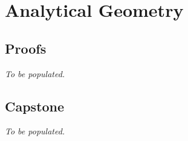 \chapter{Analytical Geometry}

\clearpage

\clearpage

\section*{Proofs}
\textit{To be populated.}

\section*{Capstone}
\textit{To be populated.}
